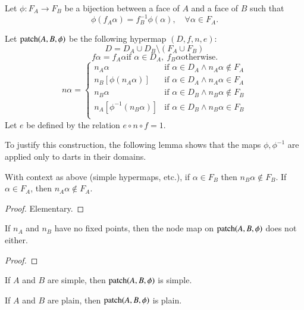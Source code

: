 Let $\phi:F_A\to F_B$ be a bijection between a face of $A$ and a
face of $B$ such that
    $$
    \phi(f_A \alpha) = f_B^{-1}\phi(\alpha),\quad \forall
    \alpha\in F_A.
    $$

\begin{definition} Let ${\operatorname{patch}}(A,B,\phi)$ be the following hypermap
$(D,f,n,e)$:
    $$D = D_A \cup D_B \setminus (F_A\cup F_B)$$
    $$f\alpha = f_A\alpha \text{if } \alpha\in D_A, \ f_B\alpha
    \text{otherwise}.
    $$
    $$n\alpha = \begin{cases}
    n_A\alpha &
        \text{if } \alpha\in D_A \wedge n_A\alpha\not\in F_A\\
    n_B[\phi(n_A\alpha)] &
        \text{if } \alpha\in D_A \wedge n_A\alpha\in F_A\\
    n_B\alpha &
        \text{if } \alpha\in D_B \wedge n_B\alpha\not\in F_B\\
    n_A[\phi^{-1}(n_B \alpha)] &
        \text{if } \alpha\in D_B \wedge n_B\alpha\in F_B\\
    \end{cases}
    $$
Let $e$ be defined by the relation $e\circ n\circ f = 1$.
\end{definition}

To justify this construction, the following lemma shows that the
maps $\phi,\phi^{-1}$ are applied only to darts in their domains.

\begin{lemma} With context as above (simple hypermaps, etc.),
if $\alpha\in F_B$ then $n_B\alpha\not\in F_B$.  If $\alpha\in
F_A$, then $n_A\alpha\not\in F_A$.
\end{lemma}

\begin{proof} Elementary.
\end{proof}

\begin{lemma} If $n_A$ and $n_B$ have no fixed points, then
    the node map on ${\operatorname{patch}}(A,B,\phi)$ does not either.
\end{lemma}

\begin{proof}
\end{proof}

\begin{lemma} If $A$ and $B$ are simple, then
${\operatorname{patch}}(A,B,\phi)$ is simple.
\end{lemma}

\begin{lemma} If $A$ and $B$ are plain, then
${\operatorname{patch}}(A,B,\phi)$ is plain.
\end{lemma}

